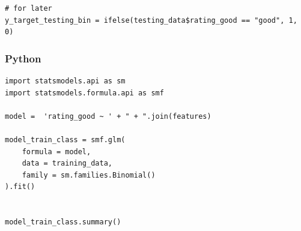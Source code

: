 \documentclass[
  letterpaper,
]{krantz}
\begin{document}
\begin{verbatim}
# for later
y_target_testing_bin = ifelse(testing_data$rating_good == "good", 1, 0)
\end{verbatim}

\subsubsection{Python}

\begin{verbatim}
import statsmodels.api as sm
import statsmodels.formula.api as smf

model =  'rating_good ~ ' + " + ".join(features)

model_train_class = smf.glm(
    formula = model,
    data = training_data,
    family = sm.families.Binomial()
).fit()


model_train_class.summary() 
\end{verbatim}
\end{document}
